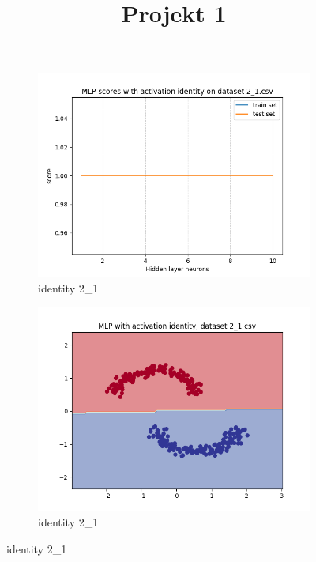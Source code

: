 \documentclass[12pt]{article}
\title{Projekt 1}
\newcommand*{\subfigwidth}{0.24\textwidth}
\begin{document}
\maketitle

\begin{figure}[H]\centering
    \begin{subfigure}[t]{\subfigwidth}
        \includegraphics[width=\linewidth]{img/exp_1/mlp/2_1/identity/scores.png}
        \caption{identity 2\_1}
    \end{subfigure}
    \hfill
    \begin{subfigure}[t]{\subfigwidth}
        \includegraphics[width=\linewidth]{img/exp_1/mlp/2_1/identity/boundary.png}
        \caption{identity 2\_1}

\end{subfigure}
\end{figure}
\end{document}
